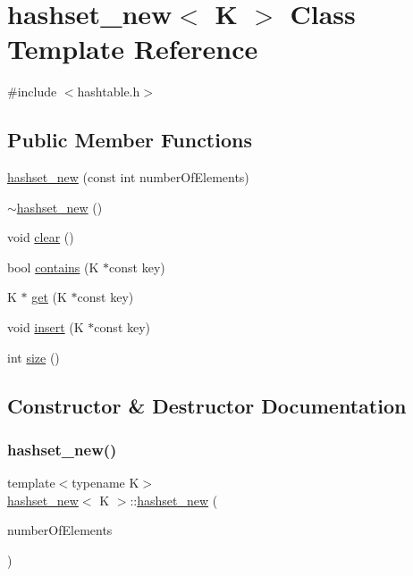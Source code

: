 \hypertarget{classhashset__new}{}\section{hashset\+\_\+new$<$ K $>$ Class Template Reference}
\label{classhashset__new}


{\ttfamily \#include $<$hashtable.\+h$>$}

\subsection*{Public Member Functions}
\begin{DoxyCompactItemize}
\item 
\hyperlink{classhashset__new_a578df467ab0aae396119a215e60e9ebf}{hashset\+\_\+new} (const int number\+Of\+Elements)
\item 
\hyperlink{classhashset__new_a20766c7defec2bd05247cb6c9e9e0e74}{$\sim$hashset\+\_\+new} ()
\item 
void \hyperlink{classhashset__new_a7abc43f557af1413d3da1784638f7cb6}{clear} ()
\item 
bool \hyperlink{classhashset__new_add908f12655d92bb0b86127573014d84}{contains} (K $\ast$const key)
\item 
K $\ast$ \hyperlink{classhashset__new_a2d37e290e39056bd9d47dcd9848bda0c}{get} (K $\ast$const key)
\item 
void \hyperlink{classhashset__new_ad46652bfebe22a086f4f648d2bdfd211}{insert} (K $\ast$const key)
\item 
int \hyperlink{classhashset__new_a15deeb34e1e00deafb9fac0511ada052}{size} ()
\end{DoxyCompactItemize}


\subsection{Constructor \& Destructor Documentation}
\mbox{\label{classhashset__new_a578df467ab0aae396119a215e60e9ebf}} 
\subsubsection{\texorpdfstring{hashset\+\_\+new()}{hashset\_new()}}
{\footnotesize\ttfamily template$<$typename K$>$ \\
\hyperlink{classhashset__new}{hashset\+\_\+new}$<$ K $>$\+::\hyperlink{classhashset__new}{hashset\+\_\+new} (\begin{DoxyParamCaption}\item[{const int}]{number\+Of\+Elements }\end{DoxyParamCaption})\hspace{0.3cm}{\ttfamily [inline]}}

